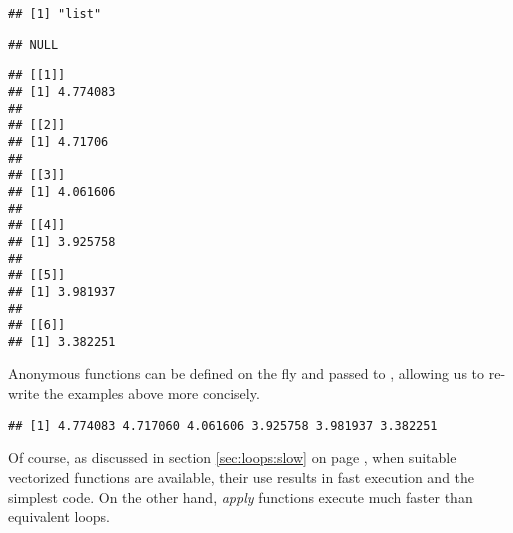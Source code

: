 \documentclass[krantz2]{krantz}\usepackage{knitr}%
\begin{document}
\begin{knitrout}\footnotesize
{}\color{fgcolor}\begin{kframe}
\begin{alltt}
 \hlkwb{<-} \hlstd{(}     \hlstd{=} \hlstd{,}  \hlstd{=} \hlstd{)}
\end{alltt}
\begin{verbatim}
## [1] "list"
\end{verbatim}
\begin{alltt}
\end{alltt}
\begin{verbatim}
## NULL
\end{verbatim}
\begin{alltt}
\end{alltt}
\begin{verbatim}
## [[1]]
## [1] 4.774083
## 
## [[2]]
## [1] 4.71706
## 
## [[3]]
## [1] 4.061606
## 
## [[4]]
## [1] 3.925758
## 
## [[5]]
## [1] 3.981937
## 
## [[6]]
## [1] 3.382251
\end{verbatim}
\end{kframe}
\end{knitrout}

Anonymous functions can be defined on the fly and passed to , allowing us to re-write the examples above more concisely.

\begin{knitrout}\footnotesize
{}\color{fgcolor}\begin{kframe}
\begin{alltt}
\hlstd{(}   \hlstd{=} \hlstd{(}\hlstd{,} \hlstd{) \{} \hlopt{+}   \hlstd{=} \hlstd{)}
\end{alltt}
\begin{verbatim}
## [1] 4.774083 4.717060 4.061606 3.925758 3.981937 3.382251
\end{verbatim}
\end{kframe}
\end{knitrout}

Of course, as discussed in section \ref{sec:loops:slow} on page \pageref{sec:loops:slow}, when suitable vectorized functions are available, their use results in fast execution and the simplest code. On the other hand, \emph{apply} functions execute much faster than equivalent  loops.
\end{document}
